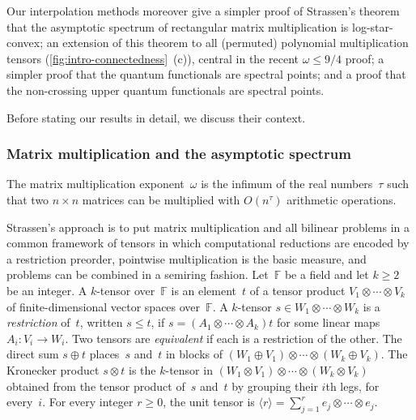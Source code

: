 \documentclass[11pt,letterpaper]{article}
\newcommand{\FF}{\mathbb{F}}
\begin{document}
Our interpolation methods moreover give a simpler proof of Strassen's theorem that the asymptotic spectrum of rectangular matrix multiplication is log-star-convex; an extension of this theorem to all (permuted) polynomial multiplication tensors (\cref{fig:intro-connectedness}~(c)), central in the recent $\omega \leq 9/4$ proof; a simpler proof that the quantum functionals \cite{MR4495838} are spectral points; and a proof that the non-crossing upper quantum functionals \cite{botero2026quantumfunctionalshigherordertensors} are spectral points.

Before stating our results in detail, we discuss their context.

\subsubsection*{Matrix multiplication and the asymptotic spectrum}

The matrix multiplication exponent~\(\omega\) is the infimum of the real numbers~\(\tau\) such that two \(n\times n\) matrices can be multiplied with \(O(n^\tau)\) arithmetic operations. 

Strassen's approach \cite{DBLP:conf/focs/Strassen86,strassen1988asymptotic} is to put matrix multiplication and all bilinear problems in a common framework of tensors in which computational reductions are encoded by a restriction preorder, pointwise multiplication is the basic measure, and problems can be combined in a semiring fashion.   Let~\(\FF\) be a field and let \(k\geq2\) be an integer. A \(k\)-tensor over~\(\FF\) is an element~\(t\) of a tensor product \(V_1\otimes\cdots\otimes V_k\) of finite-dimensional vector spaces over~\(\FF\). A \(k\)-tensor \(s\in W_1\otimes\cdots\otimes W_k\) is a \emph{restriction} of~\(t\), written \(s\leq t\), if \(s=(A_1\otimes\cdots\otimes A_k)t\) for some linear maps \(A_i:V_i\to W_i\). Two tensors are \emph{equivalent} if each is a restriction of the other. The direct sum \(s\oplus t\) places~\(s\) and~\(t\) in blocks of \((W_1\oplus V_1)\otimes\cdots\otimes(W_k\oplus V_k)\). The Kronecker product \(s\otimes t\) is the \(k\)-tensor in \((W_1\otimes V_1)\otimes\cdots\otimes(W_k\otimes V_k)\) obtained from the tensor product of~\(s\) and~\(t\) by grouping their \(i\)th legs, for every~\(i\). For every integer \(r\geq0\), the unit tensor is \(\langle r\rangle=\sum_{j=1}^r e_j\otimes\cdots\otimes e_j\).
\end{document}
